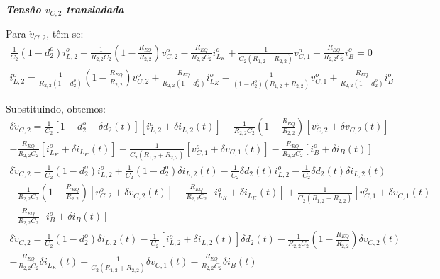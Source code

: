 \textbf{\textit{Tensão $v_{C,2}$ transladada}} \vspace*{12pt}

Para $\dot{v}_{C,2}$, têm-se:
\begin{gather*}
  \frac{1}{C_2} \left(1 - d_2^o\right) i_{L,2}^o - \frac{1}{R_{2,2}C_2} \left(1 - \frac{R_{EQ}}{R_{2,2}}\right) v_{C,2}^o - \frac{R_{EQ}}{R_{2,2} C_2} i_{L_K}^o + \frac{1}{C_2(R_{1,2} + R_{2,2})} v_{C,1}^o - \frac{R_{EQ}}{R_{2,2}C_2} i_B^o= 0
\end{gather*}
\begin{gather}
  i_{L,2}^o = \frac{1}{R_{2,2} \left(1 - d_2^o\right)} \left(1 - \frac{R_{EQ}}{R_{2,2}}\right) v_{C,2}^o + \frac{R_{EQ}}{R_{2,2} \left(1 - d_2^o\right)} i_{L_K}^o - \frac{1}{\left(1 - d_2^o\right) (R_{1,2} + R_{2,2})} v_{C,1}^o + \frac{R_{EQ}}{R_{2,2}\left(1 - d_2^o\right)} i_B^o
\end{gather}

Substituindo, obtemos:
\begin{multline*}
  \delta \dot v_{C,2} = \frac{1}{C_2} \left[1 - d_2^o - \delta d_2(t)\right] \left[i_{L,2}^o + \delta i_{L,2}(t)\right]
  - \frac{1}{R_{2,2}C_2} \left(1 - \frac{R_{EQ}}{R_{2,2}}\right) \left[v_{C,2}^o + \delta v_{C,2}(t)\right] \\
  - \frac{R_{EQ}}{R_{2,2} C_2} \left[i_{L_K}^o + \delta i_{L_K}(t)\right] + \frac{1}{C_2(R_{1,2} + R_{2,2})} \left[v_{C,1}^o + \delta v_{C,1}(t)\right] - \frac{R_{EQ}}{R_{2,2} C_2} \left[i_B^o + \delta i_B(t)\right]
\end{multline*}
\begin{multline*}
  \delta \dot v_{C,2} = \frac{1}{C_2} (1 - d_2^o) i_{L,2}^o + \frac{1}{C_2} (1 - d_2^o) \delta i_{L,2}(t) - \frac{1}{C_2} \delta d_2(t) i_{L,2}^o - \frac{1}{C_2} \delta d_2(t) \delta i_{L,2}(t)\\
  - \frac{1}{R_{2,2}C_2} \left(1 - \frac{R_{EQ}}{R_{2,2}}\right) \left[v_{C,2}^o + \delta v_{C,2}(t)\right]
  - \frac{R_{EQ}}{R_{2,2} C_2} \left[i_{L_K}^o + \delta i_{L_K}(t)\right] + \frac{1}{C_2(R_{1,2} + R_{2,2})} \left[v_{C,1}^o + \delta v_{C,1}(t)\right] \\
  - \frac{R_{EQ}}{R_{2,2} C_2} \left[i_B^o + \delta i_B(t)\right]
\end{multline*}
\begin{multline*}
  \delta \dot v_{C,2} = \frac{1}{C_2} (1 - d_2^o) \delta i_{L,2}(t) - \frac{1}{C_2} \left[i_{L,2}^o + \delta i_{L,2}(t)\right] \delta d_2(t)
  - \frac{1}{R_{2,2}C_2} \left(1 - \frac{R_{EQ}}{R_{2,2}}\right) \delta v_{C,2}(t)  \\
  - \frac{R_{EQ}}{R_{2,2} C_2} \delta i_{L_K}(t) + \frac{1}{C_2(R_{1,2} + R_{2,2})}  \delta v_{C,1}(t) - \frac{R_{EQ}}{R_{2,2} C_2} \delta i_B(t)
\end{multline*}


